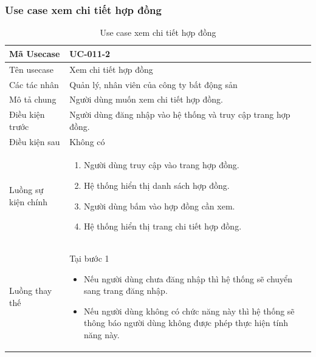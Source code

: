 \documentclass[12pt,a4paper]{article}
\begin{document}
    \subsubsection*{Use case xem chi tiết hợp đồng }
    \begin{table}[H]
        \centering
        \begin{tabular}{|p{3.5cm}|p{11.5cm}|c|}
            \hline
            Mã Usecase      & UC-011-2                                                      \\
            \hline
            Tên usecase     & Xem chi tiết hợp đồng                                         \\
            \hline
            Các tác nhân    & Quản lý, nhân viên của công ty bất động sản                   \\
            \hline
            Mô tả chung     & Người dùng muốn xem chi tiết hợp đồng.                        \\
            \hline

            Điều kiện trước & Người dùng đăng nhập vào hệ thống và truy cập trang hợp đồng. \\
            \hline

            Điều kiện sau   & Không có                                                      \\
            \hline

            Luồng sự kiện chính & \vspace{-.8cm}\begin{enumerate}
                                                    \item Người dùng truy cập vào trang hợp đồng.
                                                    \item Hệ thống hiển thị danh sách hợp đồng.
                                                    \item Người dùng bấm vào hợp đồng cần xem.
                                                    \item Hệ thống hiển thị trang chi tiết hợp đồng.
            \end{enumerate}
            \\
            \hline
            Luồng thay thế & Tại bước 1\newline
            \vspace{-.8cm}\begin{itemize}
                              \item Nếu người dùng chưa đăng nhập thì hệ thống sẽ chuyển sang trang đăng nhập.
                              \item  Nếu người dùng không có chức năng này thì hệ thống sẽ thông báo người dùng không được phép thực hiện tính năng này.
            \end{itemize}

            \\    \hline
        \end{tabular}
        \caption{Use case xem chi tiết hợp đồng }
    \end{table}
\end{document}
